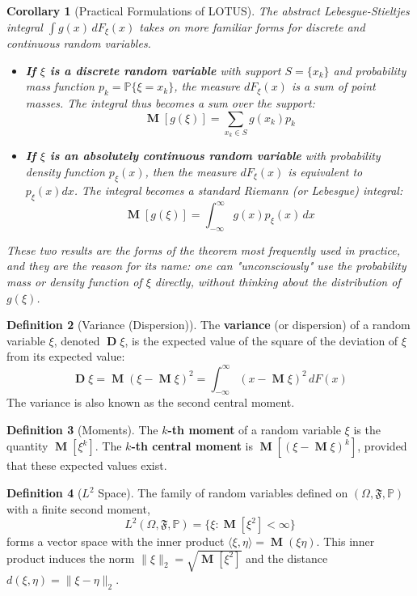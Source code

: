 \documentclass[12pt, openany]{book}
\theoremstyle{definition}
\newtheorem{definition}{Definition}[section]
\theoremstyle{plain}
\newtheorem{corollary}[definition]{Corollary}
\theoremstyle{remark}
\newcommand{\probP}{\mathbb{P}}
\newcommand{\germF}{\mathfrak{F}} %
\DeclareMathOperator{\E}{\mathbf{M}} %
\DeclareMathOperator{\V}{\mathbf{D}} %
\DeclareMathOperator{\M}{\mathbf{M}} %
\begin{document}
\begin{corollary}[Practical Formulations of LOTUS]
The abstract Lebesgue-Stieltjes integral $\int g(x) \,dF_\xi(x)$ takes on more familiar forms for discrete and continuous random variables.
\begin{itemize}
    \item \textbf{If $\xi$ is a discrete random variable} with support $S=\{x_k\}$ and probability mass function $p_k = \probP\{\xi=x_k\}$, the measure $dF_\xi(x)$ is a sum of point masses. The integral thus becomes a sum over the support:
    $$ \E[g(\xi)] = \sum_{x_k \in S} g(x_k) p_k $$
    \item \textbf{If $\xi$ is an absolutely continuous random variable} with probability density function $p_\xi(x)$, then the measure $dF_\xi(x)$ is equivalent to $p_\xi(x)dx$. The integral becomes a standard Riemann (or Lebesgue) integral:
    $$ \E[g(\xi)] = \int_{-\infty}^{\infty} g(x) p_\xi(x) \,dx $$
\end{itemize}
These two results are the forms of the theorem most frequently used in practice, and they are the reason for its name: one can "unconsciously" use the probability mass or density function of $\xi$ directly, without thinking about the distribution of $g(\xi)$.
\end{corollary}

\begin{definition}[Variance (Dispersion)]
The \textbf{variance} (or dispersion) of a random variable $\xi$, denoted $\V\xi$, is the expected value of the square of the deviation of $\xi$ from its expected value:
$$ \V\xi = \E(\xi - \E\xi)^2 = \int_{-\infty}^{\infty} (x - \E\xi)^2 \,dF(x) $$
The variance is also known as the second central moment.
\end{definition}

\begin{definition}[Moments]
The \textbf{$k$-th moment} of a random variable $\xi$ is the quantity $\M[\xi^k]$. The \textbf{$k$-th central moment} is $\M[(\xi - \M\xi)^k]$, provided that these expected values exist.
\end{definition}

\begin{definition}[$L^2$ Space]
The family of random variables defined on $(\Omega, \germF, \probP)$ with a finite second moment,
$$ L^2(\Omega, \germF, \probP) = \{\xi : \M[\xi^2] < \infty \} $$
forms a vector space with the inner product $\langle \xi, \eta \rangle = \M(\xi\eta)$. This inner product induces the norm $\|\xi\|_2 = \sqrt{\M[\xi^2]}$ and the distance $d(\xi, \eta) = \|\xi - \eta\|_2$.
\end{definition}
\end{document}
